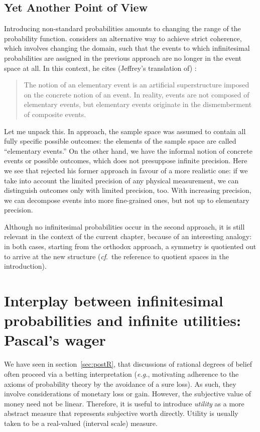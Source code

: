 \subsection{Yet Another Point of View}
Introducing non-standard probabilities amounts to changing the range of the probability function. \citet{Skyrms:1995} considers an alternative way to achieve strict coherence, which involves changing the domain, such that the events to which infinitesimal probabilities are assigned in the previous approach are no longer in the event space at all.
In this context, he cites (Jeffrey's translation of) \citet{Kolmogorov:1948}:
\begin{quote}
The notion of an elementary event is an artificial superstructure imposed on the concrete notion of an event. In reality, events are not composed of elementary events, but elementary events originate in the dismemberment of composite events.
\end{quote}
Let me unpack this. In  approach, the sample space was assumed to contain all fully specific possible outcomes: the elements of the sample space are called ``elementary events.'' On the other hand, we have the informal notion of concrete events or possible outcomes, which does not presuppose infinite precision. Here we see that \citet{Kolmogorov:1948} rejected his former approach in favour of a more realistic one: if we take into account the limited precision of any physical measurement, we can distinguish outcomes only with limited precision, too. With increasing precision, we can decompose events into more fine-grained ones, but not up to elementary precision.

Although no infinitesimal probabilities occur in the second approach, it is still relevant in the context of the current chapter, because of an interesting analogy: in both cases, starting from the orthodox approach, a symmetry is quotiented out to arrive at the new structure (\textit{cf}.\ the reference to quotient spaces in the introduction).

\section[Infinitesimal Probability and Infinite Utility]{Interplay between infinitesimal probabilities and infinite utilities: Pascal's wager}\label{sec:pascalswager}


We have seen in section~\ref{sec:postR}, that discussions of rational degrees of belief often proceed via a betting interpretation (\textit{e.g.}, motivating adherence to the axioms of probability theory by the avoidance of a sure loss). As such, they involve considerations of monetary loss or gain. However, the subjective value of money need not be linear. Therefore, it is useful to introduce \textit{utility} as a more abstract measure that represents subjective worth directly. Utility is usually taken to be a real-valued (interval scale) measure.

